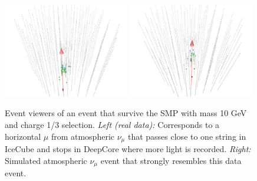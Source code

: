 \begin{appendices}
\begin{figure}
\centering
\includegraphics[width=0.49\textwidth]{appendix/img/FINAL_data_m_10_ch1ovr3_1.png}
\includegraphics[width=0.49\textwidth]{appendix/img/FINAL_data_m_10_ch1ovr3_1_NUMUANALOGY.png}
\caption{Event viewers of an event that survive the SMP with mass 10 GeV and charge 1/3 selection. \textit{Left (real data): }Corresponds to a horizontal $\mu$ from atmospheric $\nu_\mu$ that passes close to one string in IceCube and stops in DeepCore where more light is recorded. \textit{Right: }Simulated atmospheric $\nu_\mu$ event that strongly resembles this data event.}
\label{fig:final_3}
\end{figure}


\end{appendices}

